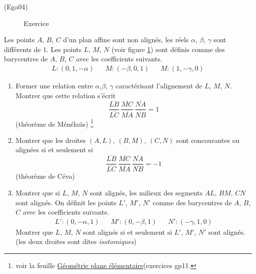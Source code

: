 \begin{tiny}(Ega04)\end{tiny}
\begin{figure}[ht]
 \centering
 
 \caption{Exercice }
 \label{fig:Ega04_1}
\end{figure}
Les points $A$, $B$, $C$ d'un plan affine sont non alignés, les réels $\alpha$, $\beta$, $\gamma$ sont différents de $1$. Les points $L$, $M$, $N$ (voir figure \ref{fig:Ega04_1}) sont définis comme des barycentres de $A$, $B$, $C$ avec les coefficients suivants.
\begin{align*}
 L:(0,1,-\alpha) & & M:(-\beta, 0, 1) & & M:(1,-\gamma, 0)
\end{align*}
\begin{enumerate}
 \item Former une relation entre $\alpha$,$\beta$, $\gamma$ caractérisant l'alignement de $L$, $M$, $N$. Montrer que cette relation s'écrit
\begin{displaymath}
\frac{\overline{LB}}{\overline{LC}}\,
\frac{\overline{MC}}{\overline{MA}}\,
\frac{\overline{NA}}{\overline{NB}}=1 
\end{displaymath}
(théorème de Ménélaüs)
\footnote{voir la feuille \href{http://back.maquisdoc.net/data/temptex/fexgp.pdf}{Géométrie plane élémentaire}(exercices gp11.}
\item Montrer que les droites $(A,L)$, $(B,M)$, $(C,N)$ sont concourantes ou alignées si et seulement si 
\begin{displaymath}
\frac{\overline{LB}}{\overline{LC}}\,
\frac{\overline{MC}}{\overline{MA}}\,
\frac{\overline{NA}}{\overline{NB}}=-1 
\end{displaymath}
(théorème de Céva)
\item Montrer que si $L$, $M$, $N$ sont alignés, les milieux des segments $AL$, $BM$, $CN$ sont alignés.\newline
On définit les points $L'$, $M'$, $N'$ comme des barycentres de $A$, $B$, $C$ avec les coefficients suivants.
\begin{align*}
 L':(0,-\alpha,1) & & M':(0,-\beta, 1) & & N':(-\gamma,1, 0)
\end{align*}
Montrer que $L$, $M$, $N$ sont alignés si et seulement si $L'$, $M'$, $N'$ sont alignés. (les deux droites sont dites \emph{isotomiques})
\end{enumerate}
